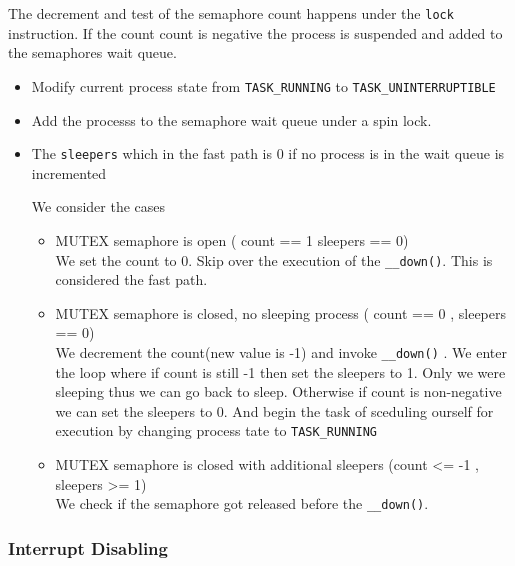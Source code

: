 \documentclass{article}
\begin{document}
The decrement and test of the semaphore count happens under the
\lstinline{lock} instruction. If the count count is negative the
process is suspended and added to the semaphores wait queue.


\begin{itemize}
  \item Modify current process state from \lstinline{TASK_RUNNING} to
    \lstinline{TASK_UNINTERRUPTIBLE}

  \item Add the processs to the semaphore wait queue under a spin
    lock. 
  \item The \lstinline{sleepers} which in the fast path is 0 if no
    process is in the wait queue is incremented
    
    We consider the cases
    \begin{itemize}
    \item MUTEX semaphore is open ( count == 1 sleepers == 0) \\
      
      We set the count to 0. Skip over the execution of the
      \lstinline{__down()}. This is considered the fast path.


    \item MUTEX semaphore is closed, no sleeping process ( count == 0 , sleepers == 0) \\
      
      We decrement the count(new value is -1) and invoke
      \lstinline{__down()} . We enter the loop where if count is still
      -1 then set the sleepers to 1. Only we were sleeping thus we can
      go back to sleep. Otherwise if count is non-negative we can set
      the sleepers to 0. And begin the task of sceduling ourself for
      execution by changing process tate to \lstinline{TASK_RUNNING}

    \item MUTEX semaphore is closed with additional sleepers (count  <= -1 , sleepers >= 1) \\

      We check if the semaphore got released before the \lstinline{__down()}. 
      
      
    \end{itemize}
\end{itemize}



\subsubsection{Interrupt Disabling} 
\end{document}
